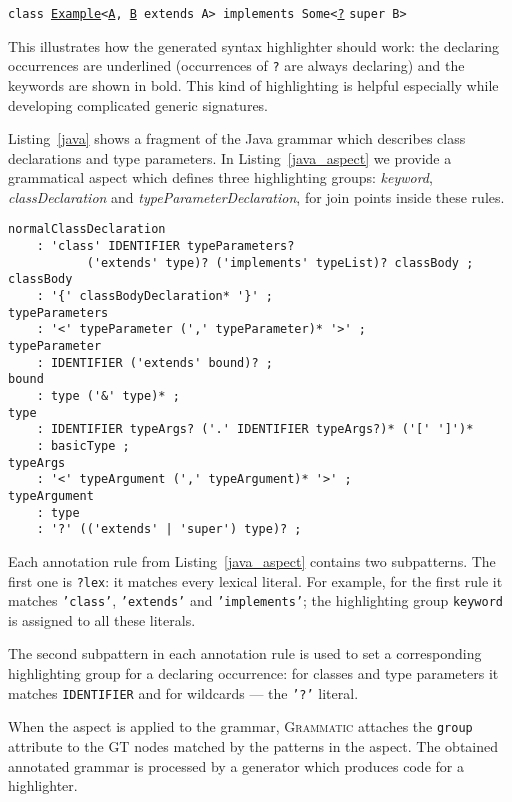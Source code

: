 \documentclass{IOS-Book-Article}     %
\newcommand{\lstref}[1]{Listing~\ref{#1}}
\newcommand{\tool}[1]{\textsc{#1}}
\newcommand{\Grammatic}[0]{\tool{Grammatic}}
\begin{document}
\lstset{language=Java}
\lstinline!class!\texttt{ \ul{Example}<\ul{A}, \ul{B} }\lstinline!extends!\texttt{ A> }\lstinline!implements!\texttt{ Some<\ul{?}} \lstinline!super!\texttt{ B>} 

This illustrates how the generated syntax highlighter should work: the declaring occurrences are underlined (occurrences of \texttt{?} are always declaring) and the keywords are shown in bold. This kind of highlighting is helpful especially while developing complicated generic signatures.

\lstref{java} shows a fragment of the Java grammar \cite{JLS} which describes class declarations and type parameters. In \lstref{java_aspect} we provide a grammatical aspect which defines three highlighting groups: \emph{keyword}, \emph{classDeclaration} and \emph{typeParameterDeclaration}, for join points inside these rules.

\begin{lstlisting}[language=Grammatic,caption=Class declaration syntax in Java 5,label=java,float]
normalClassDeclaration
	: 'class' IDENTIFIER typeParameters? 
           ('extends' type)? ('implements' typeList)? classBody ;
classBody
	: '{' classBodyDeclaration* '}' ;
typeParameters
	: '<' typeParameter (',' typeParameter)* '>' ;
typeParameter
	: IDENTIFIER ('extends' bound)? ;
bound
	: type ('&' type)* ;
type
	: IDENTIFIER typeArgs? ('.' IDENTIFIER typeArgs?)* ('[' ']')*
	: basicType ;
typeArgs
	: '<' typeArgument (',' typeArgument)* '>' ;
typeArgument
	: type
	: '?' (('extends' | 'super') type)? ;
\end{lstlisting}

\lstset{language=Grammatic}
Each annotation rule from \lstref{java_aspect} contains two subpatterns. The first one is \texttt{?lex}: it matches every lexical literal. For example, for the first rule it matches \texttt{'class'}, \texttt{'extends'} and \texttt{'implements'}; the highlighting group \texttt{keyword} is assigned to all these literals.

The second subpattern in each annotation rule is used to set a corresponding highlighting group for a declaring occurrence: for classes and type parameters it matches \texttt{IDENTIFIER} and for wildcards --- the \texttt{'?'} literal.

When the aspect is applied to the grammar, \Grammatic{} attaches the \texttt{group} attribute to the GT nodes matched by the patterns in the aspect. The obtained annotated grammar is processed by a generator which produces code for a highlighter.
\end{document}
